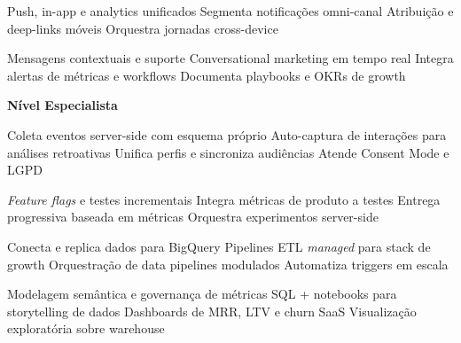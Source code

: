  Push, in-app e analytics unificados
 Segmenta notificações omni-canal
 Atribuição e deep-links móveis
 Orquestra jornadas cross-device

 Mensagens contextuais e suporte
 Conversational marketing em tempo real
 Integra alertas de métricas e workflows
 Documenta playbooks e OKRs de growth

\bigskip
\textbf{Nível Especialista}

 Coleta eventos server-side com esquema próprio
 Auto-captura de interações para análises retroativas
 Unifica perfis e sincroniza audiências
 Atende Consent Mode e LGPD

 \textit{Feature flags} e testes incrementais
 Integra métricas de produto a testes
 Entrega progressiva baseada em métricas
 Orquestra experimentos server-side

 Conecta e replica dados para BigQuery
 Pipelines ETL \textit{managed} para stack de growth
 Orquestração de data pipelines modulados
 Automatiza triggers em escala

 Modelagem semântica e governança de métricas
 SQL + notebooks para storytelling de dados
 Dashboards de MRR, LTV e churn SaaS
 Visualização exploratória sobre warehouse

